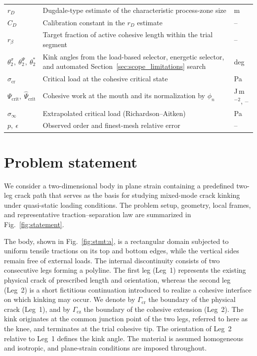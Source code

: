 \documentclass[smallextended]{svjour3}       %
\begin{document}
{\begin{longtable}{@{}>{\raggedright\arraybackslash}p{}%
			>{\raggedright\arraybackslash}p{}%
			>{\raggedleft\arraybackslash}p{}@{}}
		\(r_D\) & Dugdale-type estimate of the characteristic process-zone size & m\\
		\(C_D\) & Calibration constant in the \(r_D\) estimate & --\\
		\(r_\beta\) & Target fraction of active cohesive length within the trial segment & --\\
		\(\theta_2^\sigma,\ \theta_2^\Psi,\ \theta_2^\ast\) & Kink angles from the load-based selector, energetic selector, and automated Section~\ref{sec:scope_limitations} search & deg\\
		\(\sigma_{\mathrm{cr}}\) & Critical load at the cohesive critical state & Pa\\
		\(\Psi_{\mathrm{crit}},\ \hat\Psi_{\mathrm{crit}}\) & Cohesive work at the mouth and its normalization by \(\phi_n\) & J\,m\(^{-2}\), --\\
		\(\sigma_\infty\) & Extrapolated critical load (Richardson--Aitken) & Pa\\
		\(p,\ \epsilon\) & Observed order and finest-mesh relative error & --\\
		
	\end{longtable}
}


\section{Problem statement}
\label{sec:problem}

We consider a two-dimensional body in plane strain containing a predefined
two-leg crack path that serves as the basis for studying mixed-mode crack
kinking under quasi-static loading conditions. The problem setup, geometry,
local frames, and representative traction--separation law are summarized in
Fig.~\ref{fig:statement}.

The body, shown in Fig.~\ref{fig:stmt:a}, is a rectangular domain subjected
to uniform tensile tractions on its top and bottom edges, while the vertical
sides remain free of external loads. The internal discontinuity consists of
two consecutive legs forming a polyline. The first leg (Leg~1) represents the
existing physical crack of prescribed length and orientation, whereas the
second leg (Leg~2) is a short fictitious continuation introduced to realize a
cohesive interface on which kinking may occur. We denote by
$\Gamma_{\mathrm{cr}}$ the boundary of the physical crack (Leg~1), and by
$\Gamma_{\mathrm{cz}}$ the boundary of the cohesive extension (Leg~2). The
kink originates at the common junction point of the two legs, referred to
here as the knee, and terminates at the trial cohesive tip. The orientation
of Leg~2 relative to Leg~1 defines the kink angle. The material is assumed
homogeneous and isotropic, and plane-strain conditions are imposed
throughout.
\end{document}
